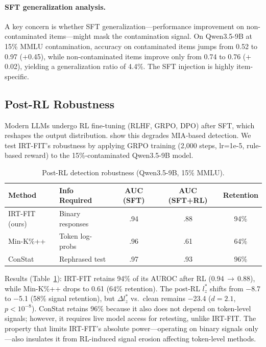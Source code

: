 \documentclass[11pt,a4paper]{article}
\begin{document}
\paragraph{SFT generalization analysis.}
A key concern is whether SFT generalization---performance improvement on non-contaminated items---might mask the contamination signal.
On Qwen3.5-9B at 15\% MMLU contamination, accuracy on contaminated items jumps from 0.52 to 0.97 ($+$0.45), while non-contaminated items improve only from 0.74 to 0.76 ($+$0.02), yielding a generalization ratio of 4.4\%.
The SFT injection is highly item-specific.

\subsection{Post-RL Robustness}
\label{sec:post-rl}

Modern LLMs undergo RL fine-tuning (RLHF, GRPO, DPO) after SFT, which reshapes the output distribution.
\citet{wang2025mia} show this degrades MIA-based detection.
We test IRT-FIT's robustness by applying GRPO training (2{,}000 steps, lr=1e-5, rule-based reward) to the 15\%-contaminated Qwen3.5-9B model.

\begin{table}[t]
\centering
\small
\caption{Post-RL detection robustness (Qwen3.5-9B, 15\% MMLU).}
\label{tab:post-rl}
\begin{tabular}{llccc}
\toprule
\textbf{Method} & \textbf{Info Required} & \textbf{AUC (SFT)} & \textbf{AUC (SFT+RL)} & \textbf{Retention} \\
\midrule
IRT-FIT (ours) & Binary responses & .94 & .88 & 94\% \\
Min-K\%++ & Token log-probs & .96 & .61 & 64\% \\
ConStat & Rephrased test & .97 & .93 & 96\% \\
\bottomrule
\end{tabular}
\end{table}

Results (Table~\ref{tab:post-rl}): IRT-FIT retains 94\% of its AUROC after RL (0.94\,$\to$\,0.88), while Min-K\%++ drops to 0.61 (64\% retention).
The post-RL $l_z^*$ shifts from $-$8.7 to $-$5.1 (58\% signal retention), but $\Delta l_z^*$ vs.\ clean remains $-$23.4 ($d = 2.1$, $p < 10^{-8}$).
ConStat retains 96\% because it also does not depend on token-level signals; however, it requires live model access for retesting, unlike IRT-FIT.
The property that limits IRT-FIT's absolute power---operating on binary signals only---also insulates it from RL-induced signal erosion affecting token-level methods.
\end{document}
